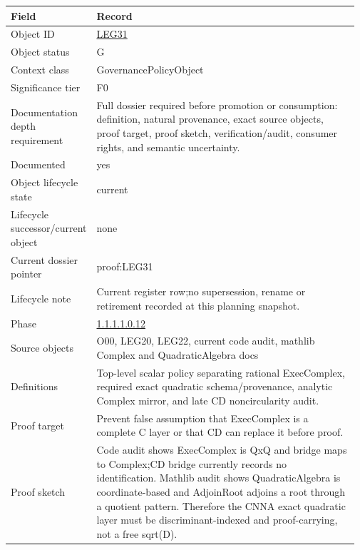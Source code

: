 \begin{longtable}{L{0.16\linewidth} L{0.81\linewidth}}
\hline
\textbf{Field} & \textbf{Record}\\
\hline
Object ID & \hyperlink{object-row-LEG31}{LEG31}\\
\hline\addlinespace[0.20em]
Object status & G\\
\hline\addlinespace[0.20em]
Context class & GovernancePolicyObject\\
\hline\addlinespace[0.20em]
Significance tier & F0\\
\hline\addlinespace[0.20em]
Documentation depth requirement & Full dossier required before promotion or consumption: definition, natural provenance, exact source objects, proof target, proof sketch, verification/\allowbreak{}audit, consumer rights, and semantic uncertainty.\\
\hline\addlinespace[0.20em]
Documented & yes\\
\hline\addlinespace[0.20em]
Object lifecycle state & current\\
\hline\addlinespace[0.20em]
Lifecycle successor/\allowbreak{}current object & none\\
\hline\addlinespace[0.20em]
Current dossier pointer & proof:LEG31\\
\hline\addlinespace[0.20em]
Lifecycle note & Current register row;\newline no supersession, rename or retirement recorded at this planning snapshot.\\
\hline\addlinespace[0.20em]
Phase & \hyperlink{phase-row-1-1-1-1-0-12}{1.1.1.1.0.12}\\
\hline\addlinespace[0.20em]
Source objects & O00, LEG20, LEG22, current code audit, mathlib Complex and QuadraticAlgebra docs\\
\hline\addlinespace[0.20em]
Definitions & Top-level scalar policy separating rational ExecComplex, required exact quadratic schema/\allowbreak{}provenance, analytic Complex mirror, and late CD noncircularity audit.\\
\hline\addlinespace[0.20em]
Proof target & Prevent false assumption that ExecComplex is a complete C layer or that CD can replace it before proof.\\
\hline\addlinespace[0.20em]
Proof sketch & Code audit shows ExecComplex is QxQ and bridge maps to Complex;\newline CD bridge currently records no identification. Mathlib audit shows QuadraticAlgebra is coordinate-based and AdjoinRoot adjoins a root through a quotient pattern. Therefore the CNNA exact quadratic layer must be discriminant-indexed and proof-carrying, not a free sqrt(D).\\

\end{longtable}
